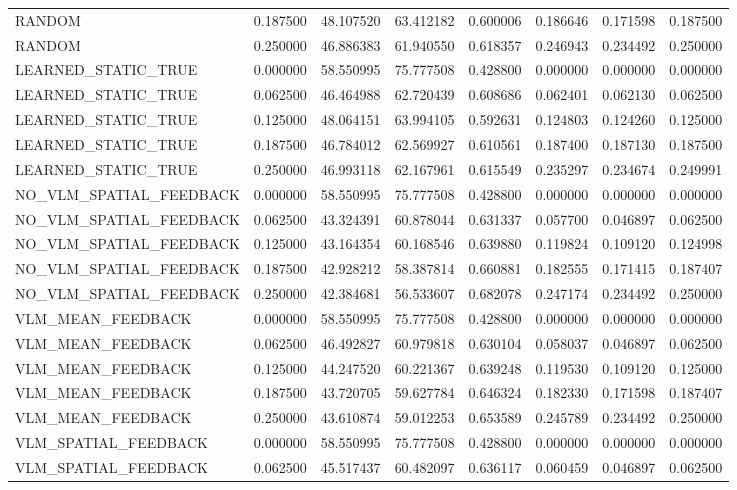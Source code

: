 \begin{tabular}{llllllll}
RANDOM & 0.187500 & 48.107520 & 63.412182 & 0.600006 & 0.186646 & 0.171598 & 0.187500 \\
RANDOM & 0.250000 & 46.886383 & 61.940550 & 0.618357 & 0.246943 & 0.234492 & 0.250000 \\
LEARNED\_STATIC\_TRUE & 0.000000 & 58.550995 & 75.777508 & 0.428800 & 0.000000 & 0.000000 & 0.000000 \\
LEARNED\_STATIC\_TRUE & 0.062500 & 46.464988 & 62.720439 & 0.608686 & 0.062401 & 0.062130 & 0.062500 \\
LEARNED\_STATIC\_TRUE & 0.125000 & 48.064151 & 63.994105 & 0.592631 & 0.124803 & 0.124260 & 0.125000 \\
LEARNED\_STATIC\_TRUE & 0.187500 & 46.784012 & 62.569927 & 0.610561 & 0.187400 & 0.187130 & 0.187500 \\
LEARNED\_STATIC\_TRUE & 0.250000 & 46.993118 & 62.167961 & 0.615549 & 0.235297 & 0.234674 & 0.249991 \\
NO\_VLM\_SPATIAL\_FEEDBACK & 0.000000 & 58.550995 & 75.777508 & 0.428800 & 0.000000 & 0.000000 & 0.000000 \\
NO\_VLM\_SPATIAL\_FEEDBACK & 0.062500 & 43.324391 & 60.878044 & 0.631337 & 0.057700 & 0.046897 & 0.062500 \\
NO\_VLM\_SPATIAL\_FEEDBACK & 0.125000 & 43.164354 & 60.168546 & 0.639880 & 0.119824 & 0.109120 & 0.124998 \\
NO\_VLM\_SPATIAL\_FEEDBACK & 0.187500 & 42.928212 & 58.387814 & 0.660881 & 0.182555 & 0.171415 & 0.187407 \\
NO\_VLM\_SPATIAL\_FEEDBACK & 0.250000 & 42.384681 & 56.533607 & 0.682078 & 0.247174 & 0.234492 & 0.250000 \\
VLM\_MEAN\_FEEDBACK & 0.000000 & 58.550995 & 75.777508 & 0.428800 & 0.000000 & 0.000000 & 0.000000 \\
VLM\_MEAN\_FEEDBACK & 0.062500 & 46.492827 & 60.979818 & 0.630104 & 0.058037 & 0.046897 & 0.062500 \\
VLM\_MEAN\_FEEDBACK & 0.125000 & 44.247520 & 60.221367 & 0.639248 & 0.119530 & 0.109120 & 0.125000 \\
VLM\_MEAN\_FEEDBACK & 0.187500 & 43.720705 & 59.627784 & 0.646324 & 0.182330 & 0.171598 & 0.187407 \\
VLM\_MEAN\_FEEDBACK & 0.250000 & 43.610874 & 59.012253 & 0.653589 & 0.245789 & 0.234492 & 0.250000 \\
VLM\_SPATIAL\_FEEDBACK & 0.000000 & 58.550995 & 75.777508 & 0.428800 & 0.000000 & 0.000000 & 0.000000 \\
VLM\_SPATIAL\_FEEDBACK & 0.062500 & 45.517437 & 60.482097 & 0.636117 & 0.060459 & 0.046897 & 0.062500 \\

\end{tabular}
